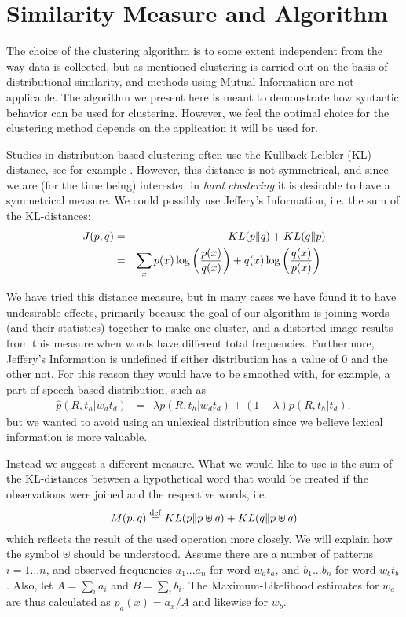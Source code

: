 \section{Similarity Measure and Algorithm}

The choice of the clustering algorithm is to some extent independent from the
way data is collected, but as mentioned clustering is carried out on the basis
of distributional similarity, and methods using Mutual Information are not
applicable. The algorithm we present here is meant to demonstrate how
syntactic behavior can be used for clustering. However, we feel the optimal
choice for the clustering method depends on the application it will be used for.

Studies in distribution based clustering often use the Kullback-Leibler (KL)
distance, see for example \cite{pereira:clust,dagan:sym}. However, this distance
is not symmetrical, and since we are (for the time being) interested in {\em
  hard clustering} it is desirable to have a symmetrical measure. We could
possibly use Jeffery's Information, i.e. the sum of the KL-distances:
\begin{eqnarray}
J(p,q) & = & KL(p \| q) + KL(q \| p) \nonumber \vspace*{2mm} \\ 
       & = & \sum_{x}p(x)\log\left(\frac{p(x)}{q(x)}\right) + 
                     q(x)\log\left(\frac{q(x)}{p(x)}\right) . \label{diverg}
\end{eqnarray}

We have tried this distance measure, but in many cases we have found
it to have undesirable effects, primarily because the goal of our
algorithm is joining words (and their statistics) together to make one
cluster, and a distorted image results from this measure when words
have different total frequencies.  Furthermore, Jeffery's Information is
undefined if either distribution has a value of 0 and the other not. 
For this reason they would have to be smoothed with, for example, a
part of speech based distribution, such as
\begin{eqnarray}
\hat{p}(R, t_{h}|w_{d}t_{d}) & = & \lambda p(R, t_{h}|w_{d}t_{d}) +
                   (1-\lambda) p(R, t_{h}|t_{d}) , \label{divsm}
\end{eqnarray}
but we wanted to avoid using an unlexical distribution since we
believe lexical information is more valuable.

Instead we suggest a different measure. What we would like to use
is the sum of the KL-distances between a hypothetical word that would
be created if the observations were joined and the respective words, i.e.
\[
M(p,q) \stackrel{\rm def}{=} KL(p \| p \uplus q) + KL(q \| p \uplus q)
\]
which reflects the result of the used operation more closely. We will explain
how the symbol $\uplus$ should be understood. Assume there are a number of
patterns $i=1...n$, and observed frequencies $a_{1}...a_{n}$ for word
$w_{a}t_{a}$, and $b_{1}...b_{n}$ for word $w_{b}t_{b}$. Also, let $A =
\sum_{i}a_{i}$ and $B = \sum_{i}b_{i}$. The Maximum-Likelihood estimates for
$w_{a}$ are thus calculated as $p_a(x) = a_{x}/A$ and likewise for $w_{b}$.

